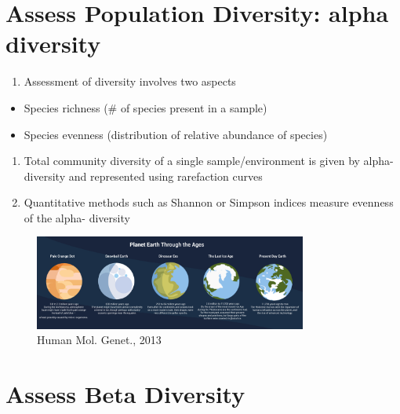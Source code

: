 \documentclass[
]{book}
\providecommand{\tightlist}{%
  \setlength{\itemsep}{0pt}\setlength{\parskip}{0pt}}
\begin{document}
\hypertarget{assess-population-diversity-alpha-diversity}{%
\section{\texorpdfstring{Assess Population Diversity: \textbf{alpha diversity}}{Assess Population Diversity: alpha diversity}}\label{assess-population-diversity-alpha-diversity}}

\begin{enumerate}
\def\labelenumi{\arabic{enumi}.}
\tightlist
\item
  Assessment of diversity involves two aspects
\end{enumerate}

\begin{itemize}
\tightlist
\item
  Species richness (\# of species present in a sample)
\item
  Species evenness (distribution of relative abundance of species)
\end{itemize}

\begin{enumerate}
\def\labelenumi{\arabic{enumi}.}
\setcounter{enumi}{1}
\item
  Total community diversity of a single sample/environment is given by alpha-diversity and represented using rarefaction curves
\item
  Quantitative methods such as Shannon or Simpson indices measure evenness of the alpha- diversity
\end{enumerate}

\begin{figure}
\centering
\includegraphics[width=0.8\textwidth,height=\textheight]{./Figures/Planets.png}
\caption{Human Mol. Genet., 2013}
\end{figure}

\hypertarget{assess-beta-diversity}{%
\section{Assess Beta Diversity}\label{assess-beta-diversity}}
\end{document}
